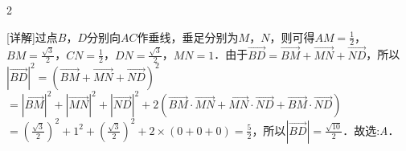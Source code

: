\documentclass[fontset=none]{ctexart}
\begin{document}
\begin{multicols}{2}
\vspace{2mm}
\noindent\begin{minipage}[t]{46.368mm}\raggedright [详解]过点\(B\)，\(D\)分别向\(AC\)作垂线，垂足分别为\(M\)，\(N\)，则可得\(AM = \frac{1}{2}\)，\(BM = \frac{\sqrt{3}}{2}\)，\(CN = \frac{1}{2}\)，\(DN = \frac{\sqrt{3}}{2}\)，\(MN = 1\)．由于\(\overrightarrow{BD} = \overrightarrow{BM} + \overrightarrow{MN} + \overrightarrow{ND}\)，所以\(|\overrightarrow{BD}|^{2} = {(\overrightarrow{BM} + \overrightarrow{MN} + \overrightarrow{ND})}^{2}\)\(= |\overrightarrow{BM}|^{2} + |\overrightarrow{MN}|^{2} + |\overrightarrow{ND}|^{2} + 2(\overrightarrow{BM} \cdot \overrightarrow{MN} + \overrightarrow{MN} \cdot \overrightarrow{ND} + \overrightarrow{BM} \cdot \overrightarrow{ND})\)\(= ( \frac{\sqrt{3}}{2} )^{2} + 1^{2} + ( \frac{\sqrt{3}}{2} )^{2} + 2 \times (0 + 0 + 0) = \frac{5}{2}\)，所以\(|\overrightarrow{BD}| = \frac{\sqrt{10}}{2}\)．故选:\emph{A}．\end{minipage}\par
\vspace{2mm}
\end{multicols}
\end{document}
